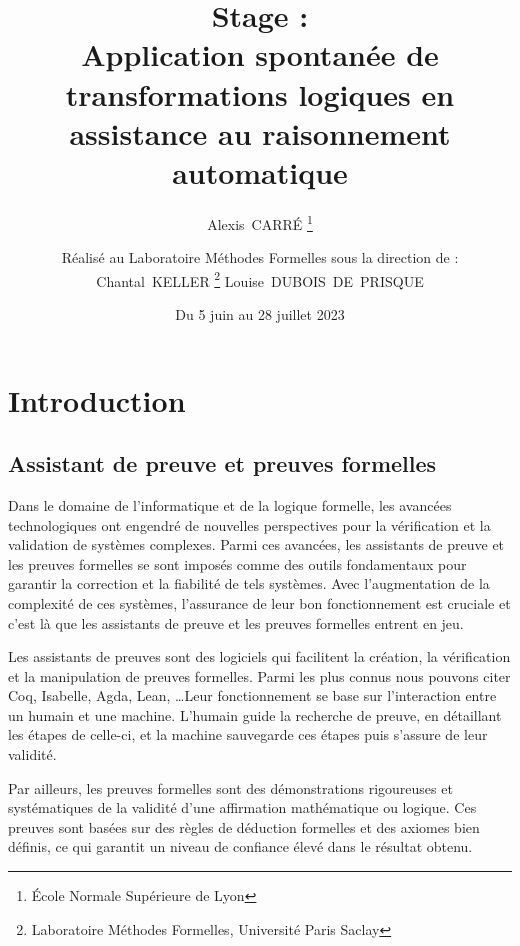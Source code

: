 \documentclass[french,titlepage]{article}
\begin{document}
\title{
    Stage :\\[1em]
    Application spontanée de transformations logiques en assistance au raisonnement automatique
}
\date{Du 5 juin au 28 juillet 2023}
\author{
    Alexis~CARRÉ \thanks{École Normale Supérieure de Lyon}
    \vspace{1em}
    \and
    Réalisé au Laboratoire Méthodes Formelles sous la direction de :\\[1em]
    Chantal~KELLER \thanks{Laboratoire Méthodes Formelles, Université Paris Saclay}
    \hspace{1em}
    Louise~DUBOIS~DE~PRISQUE\footnotemark[2]
    \vspace{2em}
}
\maketitle



\tableofcontents
\newpage



\section{Introduction} \label{intro}
\subsection{Assistant de preuve et preuves formelles} \label{intro:preuves_formelles}
Dans le domaine de l'informatique et de la logique formelle, les avancées technologiques ont engendré de nouvelles perspectives pour la vérification et la validation de systèmes complexes. Parmi ces avancées, les assistants de preuve et les preuves formelles se sont imposés comme des outils fondamentaux pour garantir la correction et la fiabilité de tels systèmes. Avec l'augmentation de la complexité de ces systèmes, l'assurance de leur bon fonctionnement est cruciale et c'est là que les assistants de preuve et les preuves formelles entrent en jeu.

Les assistants de preuves sont des logiciels qui facilitent la création, la vérification et la manipulation de preuves formelles. Parmi les plus connus nous pouvons citer Coq, Isabelle, Agda, Lean, \dots Leur fonctionnement se base sur l'interaction entre un humain et une machine. L'humain guide la recherche de preuve, en détaillant les étapes de celle-ci, et la machine sauvegarde ces étapes puis s'assure de leur validité.

Par ailleurs, les preuves formelles sont des démonstrations rigoureuses et systématiques de la validité d'une affirmation mathématique ou logique. Ces preuves sont basées sur des règles de déduction formelles et des axiomes bien définis, ce qui garantit un niveau de confiance élevé dans le résultat obtenu.
\end{document}
